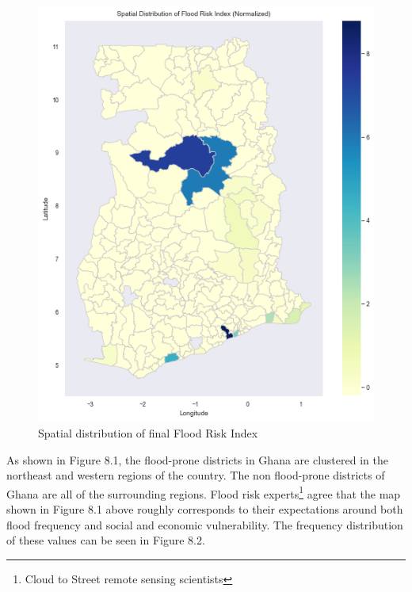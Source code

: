 \begin{figure}
  \begin{center}
    \includegraphics[scale=0.8]{images/01-map.png}
  \end{center}
  \caption{Spatial distribution of final Flood Risk Index}
\end{figure}

As shown in Figure 8.1, the flood-prone districts in Ghana are clustered in the northeast and western regions of the country. The non flood-prone districts of Ghana are all of the surrounding regions. Flood risk experts\footnote{Cloud to Street remote sensing scientists} agree that the map shown in Figure 8.1 above roughly corresponds to their expectations around both flood frequency and social and economic vulnerability. The frequency distribution of these values can be seen in Figure 8.2. \\

